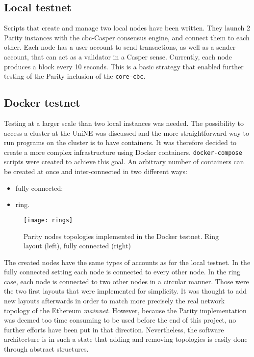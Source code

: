 \subsection{Local testnet}
Scripts that create and manage two local nodes have been written. They launch 2
Parity instances with the \gls{cbc}-Casper consensus engine, and connect them
to each other. Each node has a user account to send transactions, as well as a
sender account, that can act as a validator in a Casper sense. Currently, each
node produces a block every 10 seconds. This is a basic strategy that enabled
further testing of the Parity inclusion of the \texttt{core-cbc}.

\subsection{Docker testnet}
Testing at a larger scale than two local instances was needed. The possibility
to access a cluster at the UniNE was discussed and the more straightforward way
to run programs on the cluster is to have containers. It was therefore decided
to create a more complex infrastructure using Docker containers.
\texttt{docker-compose} scripts were created to achieve this goal. An arbitrary
number of containers can be created at once and inter-connected in two different
ways:
\begin{itemize}
    \item fully connected;
    \item ring.
\end{itemize}

\begin{figure}
	\centering
	\texttt{[image: rings]}
    \caption{Parity nodes topologies implemented in the Docker testnet. Ring
    layout (left), fully connected (right)}
	\label{fig:layout}
\end{figure}

The created nodes have the same types of accounts as for the local testnet.
In the fully connected setting each node is connected to every other node. In
the ring case, each node is connected to two other nodes in a circular manner.
Those were the two first layouts that were implemented for simplicity. It was
thought to add new layouts afterwards in order to match more precisely the real
network topology of the Ethereum \textit{mainnet}. However, because the Parity
implementation was deemed too time consuming to be used before the end of this
project, no further efforts have been put in that direction. Nevertheless, the
software architecture is in such a state that adding and removing topologies is
easily done through abstract structures.
